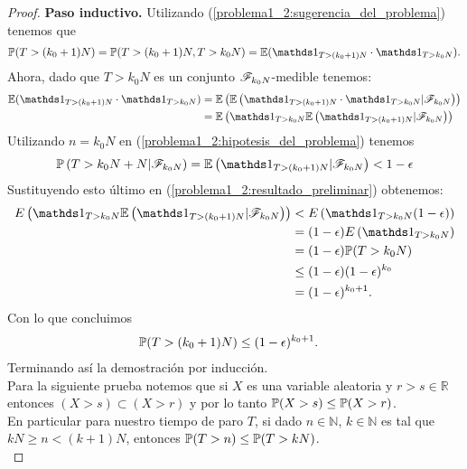 \begin{proof}
	\textbf{Paso inductivo.} 
	Utilizando (\ref{problema1_2:sugerencia_del_problema}) tenemos que
		\begin{align}
			\mw(T>(k_0+1)N) = \mw(T>(k_0+1)N, T>k_0N) = \E(\indic_{T>(k_0+1)N} \cdot \indic_{T>k_0N}).
		\end{align}
	Ahora, dado que $T>k_0N$ es un conjunto $\mathscr{F}_{k_0N}$-medible tenemos:
	\begin{align} 
		\E(\indic_{T>(k_0+1)N} \cdot \indic_{T>k_0N}) 	&=		\E\left(\E\left(\indic_{T>(k_0+1)N} \cdot \indic_{T>k_0N} | \F_{k_0N}\right)\right) \\ 
														&=		\E\left(\indic_{T>k_0N} \E\left(\indic_{T>(k_0+1)N}|\F_{k_0N}\right)\right) \label{problema1_2:resultado_preliminar}
	\end{align}
	Utilizando  $n=k_0N$ en (\ref{problema1_2:hipotesis_del_problema}) tenemos
	\begin{align}
		\mw\left(T>k_0N+N|\F_{k_0N}\right) = \E\left(\indic_{T>(k_0+1)N}|\F_{k_0N}\right) < 1-\epsilon
	\end{align}
	Sustituyendo esto último en (\ref{problema1_2:resultado_preliminar}) obtenemos:
		\begin{align}
				 E\left(\indic_{T>k_0N} \E\left(\indic_{T>(k_0+1)N}|\F_{k_0N}\right)\right) 	&< 		E\left(\indic_{T>k_0N} (1-\epsilon)\right) \\
																								&=	 	(1-\epsilon) E\left(\indic_{T>k_0N} \right) \\
																								&=		(1-\epsilon) \mw(T>k_0N) \\
																								&\leq   (1-\epsilon)(1-\epsilon)^{k_0} \\
																								&= (1-\epsilon)^{k_0 + 1}.
		\end{align}
	Con lo que concluimos
		\begin{align}
			\mathbb{P}(T>(k_0+1)N) &\leq (1-\epsilon)^{k_0 + 1}.
		\end{align}
	Terminando así la demostración por inducción.\\
	
	
	Para la siguiente prueba notemos que si $X$ es una variable aleatoria y $r > s \in \mathbb{R}$ entonces
	$(X > s) \subset (X > r)$ y por lo tanto $\mathbb{P}(X > s) \leq \mathbb{P}(X > r)$.\\
	
	En particular para nuestro tiempo de paro $T$, si dado $n \in \mathbb{N}$, $k \in \mathbb{N}$ es tal que 
	$kN \geq n < (k+1)N$, entonces $\mathbb{P}(T > n) \leq \mathbb{P}(T > kN)$.\\	


\end{proof}
